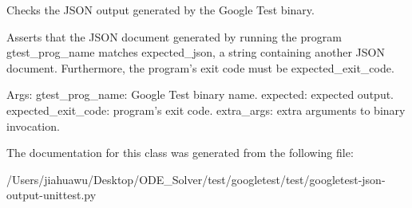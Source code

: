 \begin{DoxyVerb}Checks the JSON output generated by the Google Test binary.

Asserts that the JSON document generated by running the program
gtest_prog_name matches expected_json, a string containing another
JSON document.  Furthermore, the program's exit code must be
expected_exit_code.

Args:
  gtest_prog_name: Google Test binary name.
  expected: expected output.
  expected_exit_code: program's exit code.
  extra_args: extra arguments to binary invocation.
\end{DoxyVerb}
 

The documentation for this class was generated from the following file\+:\begin{DoxyCompactItemize}
\item 
/\+Users/jiahuawu/\+Desktop/\+O\+D\+E\+\_\+\+Solver/test/googletest/test/googletest-\/json-\/output-\/unittest.\+py\end{DoxyCompactItemize}
